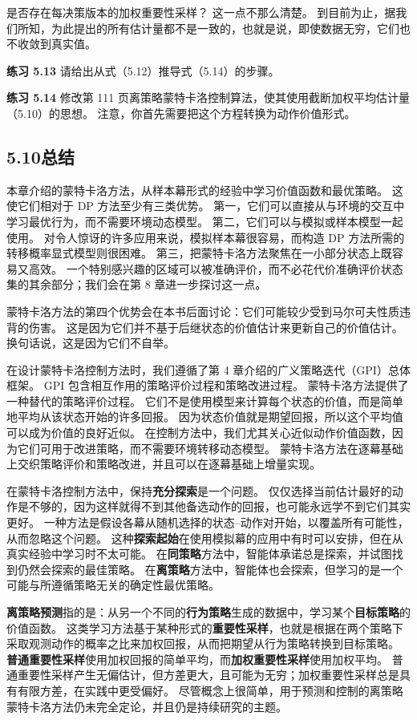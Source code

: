 \documentclass[UTF8, 12pt, fontset=fandol, oneside]{ctexart}
\begin{document}
是否存在每决策版本的加权重要性采样？
这一点不那么清楚。
到目前为止，据我们所知，为此提出的所有估计量都不是一致的，也就是说，即使数据无穷，它们也不收敛到真实值。

\noindent\textbf{练习 5.13}
请给出从式（5.12）推导式（5.14）的步骤。

\noindent\textbf{练习 5.14}
修改第 111 页离策略蒙特卡洛控制算法，使其使用截断加权平均估计量（5.10）的思想。
注意，你首先需要把这个方程转换为动作价值形式。

\subsection*{5.10\quad 总结}

本章介绍的蒙特卡洛方法，从样本幕形式的经验中学习价值函数和最优策略。
这使它们相对于 DP 方法至少有三类优势。
第一，它们可以直接从与环境的交互中学习最优行为，而不需要环境动态模型。
第二，它们可以与模拟或样本模型一起使用。
对令人惊讶的许多应用来说，模拟样本幕很容易，而构造 DP 方法所需的转移概率显式模型则很困难。
第三，把蒙特卡洛方法聚焦在一小部分状态上既容易又高效。
一个特别感兴趣的区域可以被准确评价，而不必花代价准确评价状态集的其余部分；我们会在第 8 章进一步探讨这一点。

蒙特卡洛方法的第四个优势会在本书后面讨论：它们可能较少受到马尔可夫性质违背的伤害。
这是因为它们并不基于后继状态的价值估计来更新自己的价值估计。
换句话说，这是因为它们不自举。

在设计蒙特卡洛控制方法时，我们遵循了第 4 章介绍的广义策略迭代（GPI）总体框架。
GPI 包含相互作用的策略评价过程和策略改进过程。
蒙特卡洛方法提供了一种替代的策略评价过程。
它们不是使用模型来计算每个状态的价值，而是简单地平均从该状态开始的许多回报。
因为状态价值就是期望回报，所以这个平均值可以成为价值的良好近似。
在控制方法中，我们尤其关心近似动作价值函数，因为它们可用于改进策略，而不需要环境转移动态模型。
蒙特卡洛方法在逐幕基础上交织策略评价和策略改进，并且可以在逐幕基础上增量实现。

在蒙特卡洛控制方法中，保持\textbf{充分探索}是一个问题。
仅仅选择当前估计最好的动作是不够的，因为这样就得不到其他备选动作的回报，也可能永远学不到它们其实更好。
一种方法是假设各幕从随机选择的状态--动作对开始，以覆盖所有可能性，从而忽略这个问题。
这种\textbf{探索起始}在使用模拟幕的应用中有时可以安排，但在从真实经验中学习时不太可能。
在\textbf{同策略}方法中，智能体承诺总是探索，并试图找到仍然会探索的最佳策略。
在\textbf{离策略}方法中，智能体也会探索，但学习的是一个可能与所遵循策略无关的确定性最优策略。

\textbf{离策略预测}指的是：从另一个不同的\textbf{行为策略}生成的数据中，学习某个\textbf{目标策略}的价值函数。
这类学习方法基于某种形式的\textbf{重要性采样}，也就是根据在两个策略下采取观测动作的概率之比来加权回报，从而把期望从行为策略转换到目标策略。
\textbf{普通重要性采样}使用加权回报的简单平均，而\textbf{加权重要性采样}使用加权平均。
普通重要性采样产生无偏估计，但方差更大，且可能为无穷；加权重要性采样总是具有有限方差，在实践中更受偏好。
尽管概念上很简单，用于预测和控制的离策略蒙特卡洛方法仍未完全定论，并且仍是持续研究的主题。
\end{document}
